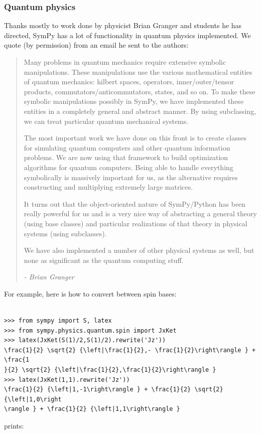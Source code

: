 \documentclass[12pt]{article}
\begin{document}
\subsubsection{Quantum physics}

Thanks mostly to work done by physicist Brian Granger and students
he has directed, SymPy has a lot of functionality in quantum physics
implemented. We quote (by permission) from an email he sent to the authors:

\begin{quotation}
Many problems in quantum mechanics require extensive symbolic
manipulations.  These manipulations use the various mathematical
entities of quantum mechanics:  hilbert spaces, operators,
inner/outer/tensor products, commutators/anticommutators, states,
and so on.  To make these symbolic manipulations possibly in SymPy, we have
implemented these entities in a completely general and abstract
manner.  By using subclassing, we can treat particular quantum
mechanical systems.

The most important work we have done on this front is to create
classes for simulating quantum computers and other quantum information
problems.  We are now using that framework to build optimization
algorithms for quantum computers.  Being able to handle everything
symbolically is massively important for us, as the alternative
requires constructing and multiplying extremely large matrices.

It turns out that the object-oriented nature of SymPy/Python has been
really powerful for us and is a very nice way of abstracting a general
theory (using base classes) and particular realizations of that theory in
physical systems (using subclasses).

We have also implemented a number of other physical systems as well,
but none as significant as the quantum computing stuff.

{\em - Brian Granger}
\end{quotation}

For example, here is how to convert between spin bases:

\begin{Verbatim}[fontsize=\scriptsize,fontfamily=courier,fontshape=tt,frame=single,label=SymPy]

>>> from sympy import S, latex
>>> from sympy.physics.quantum.spin import JxKet
>>> latex(JxKet(S(1)/2,S(1)/2).rewrite('Jz'))
\frac{1}{2} \sqrt{2} {\left|\frac{1}{2},- \frac{1}{2}\right\rangle } + \frac{1
}{2} \sqrt{2} {\left|\frac{1}{2},\frac{1}{2}\right\rangle }
>>> latex(JxKet(1,1).rewrite('Jz'))
\frac{1}{2} {\left|1,-1\right\rangle } + \frac{1}{2} \sqrt{2} {\left|1,0\right
\rangle } + \frac{1}{2} {\left|1,1\right\rangle }

\end{Verbatim}
prints:
\end{document}
